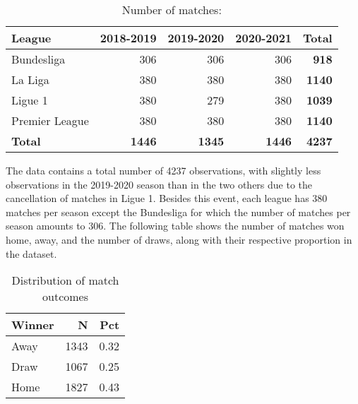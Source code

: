 \documentclass[
]{article}
\newenvironment{Shaded}{\begin{snugshade}}{\end{snugshade}}
\newcommand{\CommentTok}[1]{\textcolor[rgb]{0.56,0.35,0.01}{\textit{#1}}}
\newcommand{\DataTypeTok}[1]{\textcolor[rgb]{0.13,0.29,0.53}{#1}}
\newcommand{\KeywordTok}[1]{\textcolor[rgb]{0.13,0.29,0.53}{\textbf{#1}}}
\newcommand{\NormalTok}[1]{#1}
\newcommand{\OperatorTok}[1]{\textcolor[rgb]{0.81,0.36,0.00}{\textbf{#1}}}
\newcommand{\StringTok}[1]{\textcolor[rgb]{0.31,0.60,0.02}{#1}}
\begin{document}
\begin{table}

\caption{\label{tab:unnamed-chunk-9}Number of matches:}
\centering
\begin{tabular}[t]{lrrr>{}r}
\toprule
League & 2018-2019 & 2019-2020 & 2020-2021 & Total\\
\midrule
Bundesliga & 306 & 306 & 306 & \textbf{918}\\
La Liga & 380 & 380 & 380 & \textbf{1140}\\
Ligue 1 & 380 & 279 & 380 & \textbf{1039}\\
Premier League & 380 & 380 & 380 & \textbf{1140}\\
\textbf{Total} & \textbf{1446} & \textbf{1345} & \textbf{1446} & \textbf{\textbf{4237}}\\
\bottomrule
\end{tabular}
\end{table}

The data contains a total number of 4237 observations, with slightly
less observations in the 2019-2020 season than in the two others due to
the cancellation of matches in Ligue 1. Besides this event, each league
has 380 matches per season except the Bundesliga for which the number of
matches per season amounts to 306. The following table shows the number
of matches won home, away, and the number of draws, along with their
respective proportion in the dataset.

\begin{Shaded}
\end{Shaded}

\begin{table}

\caption{\label{tab:unnamed-chunk-10}Distribution of match outcomes}
\centering
\begin{tabular}[t]{lrr}
\toprule
Winner & N & Pct\\
\midrule
Away & 1343 & 0.32\\
Draw & 1067 & 0.25\\
Home & 1827 & 0.43\\
\bottomrule
\end{tabular}
\end{table}
\end{document}
